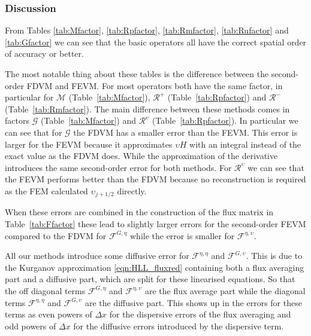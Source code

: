\subsubsection{Discussion} 
From Tables \ref{tab:Mfactor}, \ref{tab:Rpfactor}, \ref{tab:Rmfactor}, \ref{tab:Rufactor} and \ref{tab:Gfactor} we can see that the basic operators all have the correct spatial order of accuracy or better.

The most notable thing about these tables is the difference between the second-order FDVM and FEVM. For most operators both have the same factor, in particular for $\mathcal{M}$ (Table~\ref{tab:Mfactor}), $\mathcal{R}^+$ (Table~\ref{tab:Rpfactor}) and $\mathcal{R}^-$ (Table~\ref{tab:Rmfactor}). The main difference between these methods comes in factors $\mathcal{G}$ (Table~\ref{tab:Mfactor}) and $\mathcal{R}^\upsilon$ (Table~\ref{tab:Rpfactor}). In particular we can see that for $\mathcal{G}$ the FDVM has a smaller error than the FEVM. This error is larger for the FEVM because it approximates $\upsilon H$ with an integral instead of the exact value as the FDVM does. While the approximation of the derivative introduces the same second-order error for both methods. For $\mathcal{R}^\upsilon$ we can see that the FEVM performs better than the FDVM because no reconstruction is required as the FEM calculated $\upsilon_{j+1/2}$ directly. 

When these errors are combined in the construction of the flux matrix in Table~\ref{tab:Ffactor} these lead to slightly larger errors for the second-order FEVM compared to the FDVM for $\mathcal{F}^{G,\eta}$ while the error is smaller for $ \mathcal{F}^{\eta,\upsilon}$.

All our methods introduce some diffusive error for $ \mathcal{F}^{\eta,\eta}$ and $\mathcal{F}^{G,\upsilon}$. This is due to the Kurganov approximation \eqref{eqn:HLL_fluxred} containing both a flux averaging part and a diffusive part, which are split for these linearised equations. So that the off diagonal terms $\mathcal{F}^{G,\eta}$ and $\mathcal{F}^{\eta,\upsilon}$ are the flux average part while the diagonal terms $\mathcal{F}^{\eta,\eta}$ and $\mathcal{F}^{G,\upsilon}$ are the diffusive part. This shows up in the errors for these terms as even powers of $\Delta x$ for the dispersive errors of the flux averaging and odd powers of $\Delta x$ for the diffusive errors introduced by the dispersive term.

